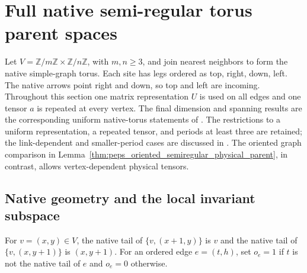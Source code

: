 \section{Full native semi-regular torus parent spaces}
\label{sec:peps_native_semiregular_parent}

Let $V=\mathbb Z/m\mathbb Z\times\mathbb Z/n\mathbb Z$, with
$m,n\ge3$, and join nearest neighbors to form the native simple-graph
torus. Each site has legs ordered as top, right, down, left.
The native arrows point right and down, so top and left are incoming.
Throughout this section one matrix representation $U$ is used on all
edges and one tensor $a$ is repeated at every vertex.
The final dimension and spanning results are the corresponding
uniform native-torus statements of
\cite[Theorems~5.7 and~5.9]{Schuch2010PEPS}.
The restrictions to a uniform representation, a repeated tensor, and
periods at least three are retained; the link-dependent and smaller-period
cases are discussed in
\cite{gap:rmp_peps_quantum_double_g_isometry,gap:rmp_peps_examples_small_torus}.
The oriented graph comparison in
Lemma~\ref{thm:peps_oriented_semiregular_physical_parent}, in contrast,
allows vertex-dependent physical tensors.

\subsection{Native geometry and the local invariant subspace}

\begin{definition}%
    \label{def:peps_native_torus_orientation}
    \leanok
    For $v=(x,y)\in V$, the native tail of $\{v,(x+1,y)\}$ is $v$ and the
    native tail of $\{v,(x,y+1)\}$ is $(x,y+1)$. For an ordered edge $e=(t,h)$,
    set $o_e=1$ if $t$ is not the native tail of $e$ and $o_e=0$ otherwise.
\end{definition}

